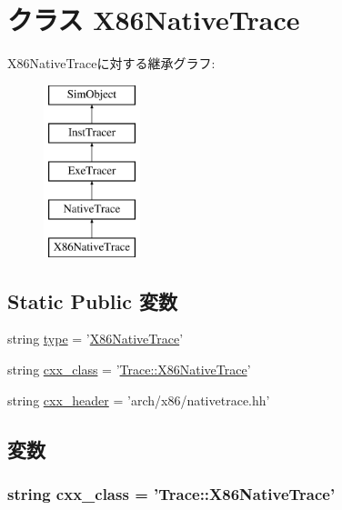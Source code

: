\hypertarget{classX86NativeTrace_1_1X86NativeTrace}{
\section{クラス X86NativeTrace}
\label{classX86NativeTrace_1_1X86NativeTrace}
}
X86NativeTraceに対する継承グラフ:\begin{figure}[H]
\begin{center}
\leavevmode
\includegraphics[height=5cm]{classX86NativeTrace_1_1X86NativeTrace}
\end{center}
\end{figure}
\subsection*{Static Public 変数}
\begin{DoxyCompactItemize}
\item 
string \hyperlink{classX86NativeTrace_1_1X86NativeTrace_acce15679d830831b0bbe8ebc2a60b2ca}{type} = '\hyperlink{classX86NativeTrace_1_1X86NativeTrace}{X86NativeTrace}'
\item 
string \hyperlink{classX86NativeTrace_1_1X86NativeTrace_a58cd55cd4023648e138237cfc0822ae3}{cxx\_\-class} = '\hyperlink{classTrace_1_1X86NativeTrace}{Trace::X86NativeTrace}'
\item 
string \hyperlink{classX86NativeTrace_1_1X86NativeTrace_a17da7064bc5c518791f0c891eff05fda}{cxx\_\-header} = 'arch/x86/nativetrace.hh'
\end{DoxyCompactItemize}


\subsection{変数}
\hypertarget{classX86NativeTrace_1_1X86NativeTrace_a58cd55cd4023648e138237cfc0822ae3}{
\subsubsection[{cxx\_\-class}]{\setlength{\rightskip}{0pt plus 5cm}string {\bf cxx\_\-class} = '{\bf Trace::X86NativeTrace}'}}
\label{classX86NativeTrace_1_1X86NativeTrace_a58cd55cd4023648e138237cfc0822ae3}


